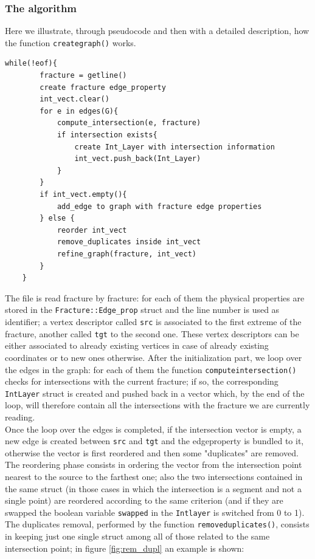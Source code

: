 \documentclass[10pt]{article} %
\begin{document}
	\subsubsection{The algorithm}
	Here we illustrate, through pseudocode and then with a detailed description, how the function \texttt{create\textunderscore graph()} works.
	\begin{lstlisting}[frame=single]
	while(!eof){
		fracture = getline()
		create fracture edge_property 
		int_vect.clear()
		for e in edges(G){
			compute_intersection(e, fracture)
			if intersection exists{
				create Int_Layer with intersection information
				int_vect.push_back(Int_Layer)
			}	
		}
		if int_vect.empty(){
			add_edge to graph with fracture edge properties
		} else {
			reorder int_vect
			remove_duplicates inside int_vect
			refine_graph(fracture, int_vect)  
		}
	}
	\end{lstlisting}
	The file is read fracture by fracture: for each of them the physical properties are stored in the \texttt{Fracture::Edge\_prop} struct and the line number is used as identifier; a vertex descriptor called \texttt{src} is associated to the first extreme of the fracture, another called \texttt{tgt} to the second one. These vertex descriptors can be either associated to already existing vertices in case of already existing coordinates or to new ones otherwise. After the initialization part, we loop over the edges in the graph: for each of them the function \texttt{compute\textunderscore intersection()} checks for intersections with the current fracture; if so, the corresponding \texttt{Int\textunderscore Layer} struct is created and pushed back in a vector which, by the end of the loop, will therefore contain all the intersections with the fracture we are currently reading. \\
	Once the loop over the edges is completed, if the intersection vector is empty, a new edge is created between \texttt{src} and \texttt{tgt} and the edge\textunderscore property is bundled to it, otherwise the vector is first reordered and then some "duplicates" are removed.
	The reordering phase consists in ordering the vector from the intersection point nearest to the source to the farthest one; also the two intersections contained in the same struct (in those cases in which the intersection is a segment and not a single point) are reordered according to the same criterion (and if they are swapped the boolean variable \texttt{swapped} in the \texttt{Int\textunderscore layer} is switched from 0 to 1).
	The duplicates removal, performed by the function \texttt{remove\textunderscore duplicates()}, consists in keeping just one single struct among all of those related to the same intersection point; in figure \ref{fig:rem_dupl} an example is shown: 
\end{document}
